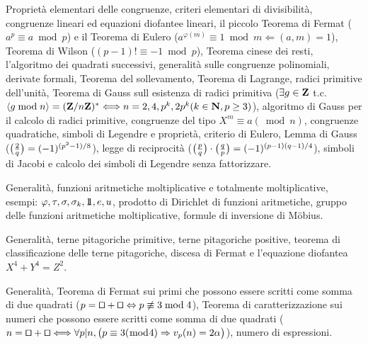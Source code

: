 
\def\square{\hbox{\rlap{$\sqcap$}$\sqcup$}}
\def\abbrcorso{TN1}
\def\titolocorso{introduzione alla teoria dei numeri}
\def\sottotitolo{{\rm http://www.mat.uniroma3.it/users/pappa/CORSI/TN1$_{-}$03$_{-}$04/TN1.htm}}
\def\docente{Prof. Francesco Pappalardi}
\def\crediti{7.5}
\def\semestre{II}
\def\esoneri{1}
\def\scrittofinale{1}
\def\oralefinale{1}
\def\altreprove{0}

\Intestazione


Propriet\`{a} elementari delle congruenze, criteri elementari di
divisibilit\`{a}, congruenze lineari ed equazioni diofantee lineari,
il piccolo Teorema di Fermat ($a^p\equiv a\bmod p$) e il Teorema di
Eulero ($a^{\varphi(m)}\equiv1\bmod m\Leftarrow(a,m)=1$), Teorema di
Wilson ($(p-1)!\equiv-1\bmod p$), Teorema cinese dei resti,
l'algoritmo dei quadrati successivi, generalit\`{a} sulle congruenze
polinomiali, derivate formali, Teorema del sollevamento, Teorema di
Lagrange, radici primitive dell'unit\`{a}, Teorema di Gauss sull
esistenza di radici primitiva ($\exists g\in{\bf Z}$ t.c. $\langle
g\bmod n\rangle =({\bf Z}/n{\bf Z})^*\Longleftrightarrow
n=2,4,p^k,2p^k (k\in{\bf N},p\geq3)$), algoritmo di Gauss per il
calcolo di radici primitive, congruenze del tipo $X^m\equiv a(\bmod
n)$, congruenze quadratiche, simboli di Legendre e propriet\`{a},
criterio di Eulero, Lemma di Gauss ($\big({2\over
q}\big)=(-1)^{(p^2-1)/8}$), legge di reciprocit\`{a} ($\big({p\over
q}\big)\cdot\big({q\over p}\big) =(-1)^{(p-1)(q-1)/4}$), simboli di
Jacobi e calcolo dei simboli di Legendre senza fattorizzare.


Generalit\`{a}, funzioni aritmetiche moltiplicative e totalmente
moltiplicative, esempi: $\varphi, \tau, \sigma, \sigma_k,
1\hskip-1.2mm1, e, u$, prodotto di Dirichlet di funzioni
aritmetiche, gruppo delle funzioni aritmetiche moltiplicative,
formule di inversione di M\"{o}bius.


Generalit\`{a}, terne pitagoriche primitive, terne pitagoriche
positive, teorema di classificazione delle terne pitagoriche,
discesa di Fermat e l'equazione diofantea $X^4+Y^4=Z^2$.


Generalit\`{a}, Teorema di Fermat sui primi che possono essere
scritti come somma di due quadrati
($p=\square+\square\Leftrightarrow p\not\equiv3\bmod4$), Teorema di
caratterizzazione sui numeri che possono essere scritti come somma
di due quadrati ($n=\square+\square\Longleftrightarrow\forall p|n,
\big(p\equiv3(\bmod 4)\Rightarrow v_p(n)=2\alpha \big)$), numero di
espressioni.

